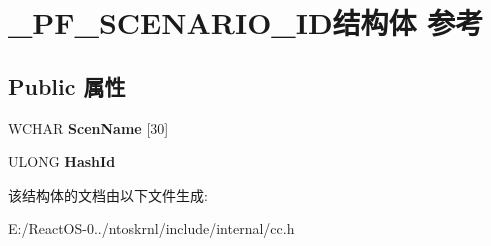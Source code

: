 \hypertarget{struct___p_f___s_c_e_n_a_r_i_o___i_d}{}\section{\+\_\+\+P\+F\+\_\+\+S\+C\+E\+N\+A\+R\+I\+O\+\_\+\+I\+D结构体 参考}
\label{struct___p_f___s_c_e_n_a_r_i_o___i_d}
\subsection*{Public 属性}
\begin{DoxyCompactItemize}
\item 
\mbox{\label{struct___p_f___s_c_e_n_a_r_i_o___i_d_a46b3d53892e4ce9c39d9cae34328fdaa}} 
W\+C\+H\+AR {\bfseries Scen\+Name} \mbox{[}30\mbox{]}
\item 
\mbox{\label{struct___p_f___s_c_e_n_a_r_i_o___i_d_a3944fb942a2ff3ec515e5e7c68113319}} 
U\+L\+O\+NG {\bfseries Hash\+Id}
\end{DoxyCompactItemize}


该结构体的文档由以下文件生成\+:\begin{DoxyCompactItemize}
\item 
E\+:/\+React\+O\+S-\/0../ntoskrnl/include/internal/cc.\+h\end{DoxyCompactItemize}
